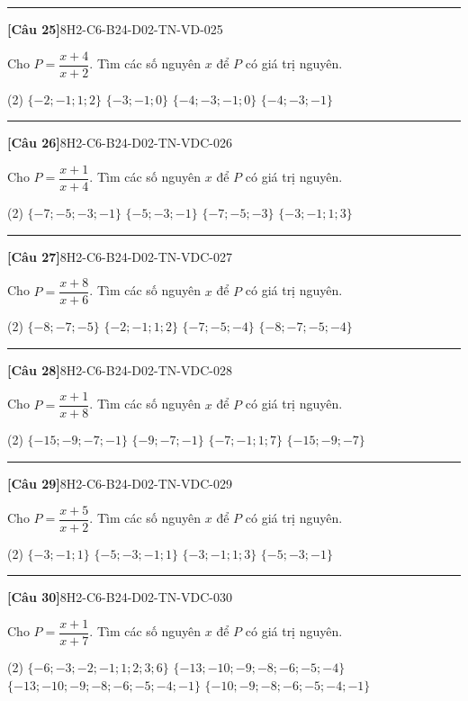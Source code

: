 \documentclass[12pt,a4paper]{article}
\newif\ifloigiai
\newenvironment{cauhoi}[2]{%
  \par\medskip\noindent\rule{\textwidth}{0.4pt}\par\nopagebreak
  \noindent\textbf{[#1]}\hfill{\scriptsize\ttfamily #2}\par\nopagebreak\smallskip}{\par}
\newcommand{\dapan}[1]{\ifloigiai\par\smallskip\noindent\textit{Đáp án:} \textbf{#1}\par\fi}
\begin{document}
\begin{cauhoi}{Câu 25}{8H2-C6-B24-D02-TN-VD-025}
Cho $P=\dfrac{x+4}{x+2}$. Tìm các số nguyên $x$ để $P$ có giá trị nguyên.
\begin{tasks}(2)
\task $\{-2; -1; 1; 2\}$
\task $\{-3; -1; 0\}$
\task $\{-4; -3; -1; 0\}$
\task $\{-4; -3; -1\}$
\end{tasks}
\dapan{C}
\end{cauhoi}
\begin{cauhoi}{Câu 26}{8H2-C6-B24-D02-TN-VDC-026}
Cho $P=\dfrac{x+1}{x+4}$. Tìm các số nguyên $x$ để $P$ có giá trị nguyên.
\begin{tasks}(2)
\task $\{-7; -5; -3; -1\}$
\task $\{-5; -3; -1\}$
\task $\{-7; -5; -3\}$
\task $\{-3; -1; 1; 3\}$
\end{tasks}
\dapan{A}
\end{cauhoi}
\begin{cauhoi}{Câu 27}{8H2-C6-B24-D02-TN-VDC-027}
Cho $P=\dfrac{x+8}{x+6}$. Tìm các số nguyên $x$ để $P$ có giá trị nguyên.
\begin{tasks}(2)
\task $\{-8; -7; -5\}$
\task $\{-2; -1; 1; 2\}$
\task $\{-7; -5; -4\}$
\task $\{-8; -7; -5; -4\}$
\end{tasks}
\dapan{D}
\end{cauhoi}
\begin{cauhoi}{Câu 28}{8H2-C6-B24-D02-TN-VDC-028}
Cho $P=\dfrac{x+1}{x+8}$. Tìm các số nguyên $x$ để $P$ có giá trị nguyên.
\begin{tasks}(2)
\task $\{-15; -9; -7; -1\}$
\task $\{-9; -7; -1\}$
\task $\{-7; -1; 1; 7\}$
\task $\{-15; -9; -7\}$
\end{tasks}
\dapan{A}
\end{cauhoi}
\begin{cauhoi}{Câu 29}{8H2-C6-B24-D02-TN-VDC-029}
Cho $P=\dfrac{x+5}{x+2}$. Tìm các số nguyên $x$ để $P$ có giá trị nguyên.
\begin{tasks}(2)
\task $\{-3; -1; 1\}$
\task $\{-5; -3; -1; 1\}$
\task $\{-3; -1; 1; 3\}$
\task $\{-5; -3; -1\}$
\end{tasks}
\dapan{B}
\end{cauhoi}
\begin{cauhoi}{Câu 30}{8H2-C6-B24-D02-TN-VDC-030}
Cho $P=\dfrac{x+1}{x+7}$. Tìm các số nguyên $x$ để $P$ có giá trị nguyên.
\begin{tasks}(2)
\task $\{-6; -3; -2; -1; 1; 2; 3; 6\}$
\task $\{-13; -10; -9; -8; -6; -5; -4\}$
\task $\{-13; -10; -9; -8; -6; -5; -4; -1\}$
\task $\{-10; -9; -8; -6; -5; -4; -1\}$
\end{tasks}
\dapan{C}
\end{cauhoi}
\end{document}

